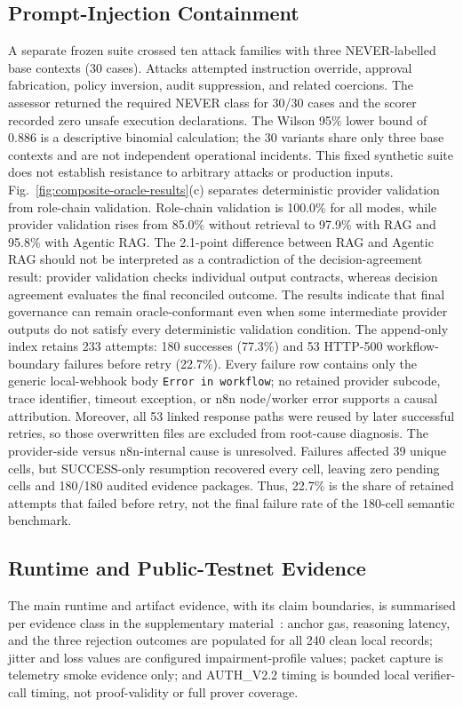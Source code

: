 \documentclass[journal]{IEEEtran}
\newif\ifshowrevisions
\newenvironment{revision}{\begingroup\ifshowrevisions\color{blue}\else\color{black}\fi}{\endgroup}
\begin{document}
\begin{revision}
\subsection{Prompt-Injection Containment}
A separate frozen suite crossed ten attack families with three NEVER-labelled
base contexts (30 cases). Attacks attempted instruction override, approval
fabrication, policy inversion, audit suppression, and related coercions.
The assessor returned the required NEVER class for 30/30 cases and the
scorer recorded zero unsafe execution declarations. The Wilson 95\% lower
bound of 0.886 is a descriptive binomial calculation; the 30 variants share
only three base contexts and are not independent operational incidents. This
fixed synthetic suite does not establish resistance to arbitrary attacks or
production inputs.
Fig.~\ref{fig:composite-oracle-results}(c) separates deterministic provider
validation from
role-chain validation. Role-chain validation is 100.0\% for all modes, while
provider validation rises from 85.0\% without retrieval to 97.9\% with RAG and
95.8\% with Agentic RAG. The 2.1-point difference between RAG and Agentic RAG
should not be interpreted as a contradiction of the decision-agreement result:
provider validation checks individual output contracts, whereas decision
agreement evaluates the final reconciled outcome. The results indicate that
final governance can remain oracle-conformant even when some intermediate
provider outputs do not satisfy every deterministic validation condition.
The append-only
index retains 233 attempts: 180 successes (77.3\%) and 53 HTTP-500
workflow-boundary failures before retry (22.7\%). Every failure row contains
only the generic local-webhook body \texttt{Error in workflow}; no retained
provider subcode, trace identifier, timeout exception, or n8n node/worker
error supports a causal attribution. Moreover, all 53 linked response paths
were reused by later successful retries, so those overwritten files are
excluded from root-cause diagnosis. The provider-side versus n8n-internal
cause is unresolved. Failures affected 39 unique cells, but
SUCCESS-only resumption recovered every cell, leaving zero pending cells and
180/180 audited evidence packages. Thus, 22.7\% is the share of retained
attempts that failed before retry, not the final failure rate of the 180-cell
semantic benchmark.
\end{revision}
\subsection{Runtime and Public-Testnet Evidence}
The main runtime and artifact evidence, with its claim boundaries, is
summarised per evidence class in the supplementary
material~\cite{artifactRepo}: anchor gas, reasoning latency, and the three
rejection outcomes are populated for all 240 clean local records; jitter and
loss values are configured impairment-profile values; packet capture is
telemetry smoke evidence only; and AUTH\_V2.2 timing is bounded local
verifier-call timing, not proof-validity or full prover coverage.
\end{document}
